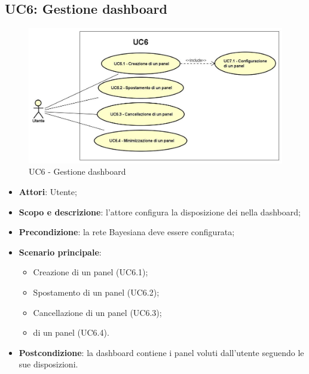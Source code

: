 \subsection{UC6: Gestione dashboard}
\hypertarget{UC6}{}
\begin{figure} [H]
	\centering
	\includegraphics[scale=0.45]{Img/UC6}
	\caption{UC6 - Gestione dashboard}\label{}
\end{figure}
\begin{itemize}
	\item \textbf{Attori}: Utente;
	\item \textbf{Scopo e descrizione}: l'attore configura la disposizione dei  nella dashboard;
	\item \textbf{Precondizione}: la rete Bayesiana deve essere configurata;
	\item \textbf{Scenario principale}:
	\begin{itemize}
		\item Creazione di un panel  (UC6.1);
		\item Spostamento di un panel  (UC6.2);
		\item Cancellazione di un panel  (UC6.3);
		\item {} di un panel  (UC6.4).
	\end{itemize}
	\item \textbf{Postcondizione}: la dashboard contiene i panel voluti dall'utente seguendo le sue disposizioni.
\end{itemize}
